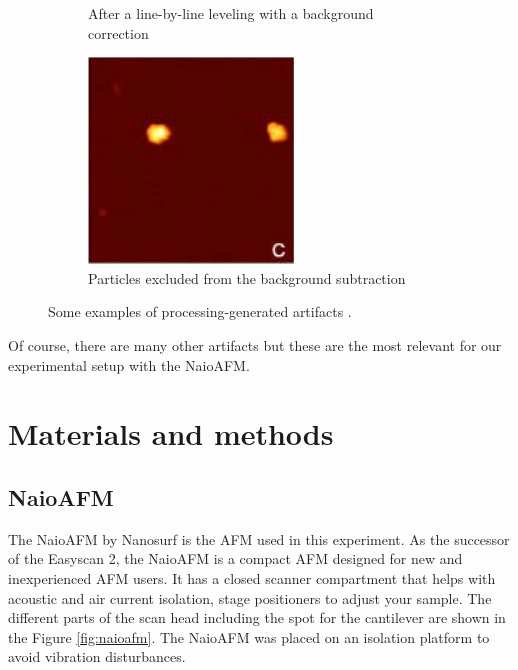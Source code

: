 \documentclass[11pt,a4paper]{article}
\begin{document}
\begin{figure}[H]
\begin{subfigure}[b]{0.3\textwidth}
\caption{After a line-by-line leveling with a background correction}
\label{fig:artifacts_processing_2}
\end{subfigure}
\begin{subfigure}[b]{0.3\textwidth}
\includegraphics[width=\textwidth]{artifacts_processing_3}
\caption{Particles excluded from the background subtraction}
\label{fig:artifacts_processing_3}
\end{subfigure}
\caption{Some examples of processing-generated artifacts \cite{artifacts}.}
\label{fig:artifacts_processing}
\end{figure}

Of course, there are many other artifacts but these are the most relevant for our experimental setup with the NaioAFM.

\section{Materials and methods}

\subsection{NaioAFM}

The NaioAFM by Nanosurf \cite{NaioAFM} is the AFM used in this experiment. As the successor of the Easyscan 2, the NaioAFM is a compact AFM designed for new and inexperienced AFM users. It has a closed scanner compartment that helps with acoustic and air current isolation, stage positioners to adjust your sample. The different parts of the scan head including the spot for the cantilever are shown in the Figure \ref{fig:naioafm}. The NaioAFM was placed on an isolation platform to avoid vibration disturbances.
\end{document}
